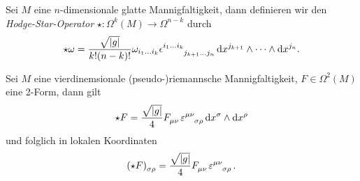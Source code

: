 \begin{definition}
Sei $M$ eine $n$-dimensionale glatte Mannigfaltigkeit, dann definieren wir den
\emph{Hodge-Star-Operator} $\star:\Omega^k(M)\to \Omega^{n-k}$ durch
\begin{equation}
\star \omega = \frac{\sqrt{\vert g \vert}}{k!(n-k)!} 
\omega_{i_1 \dots i_k} 
\tensor{\epsilon}{^{i_1 \dots i_k}_{j_{k+1} \dots j_n}}
\dif x^{j_{k+1}} \wedge \dots \wedge \dif x^{j_n}.
\end{equation}
\end{definition}
\begin{beispiel}
Sei $M$ eine vierdinemsionale (pseudo-)riemannsche Mannigfaltigkeit, $F\in
\Omega^2(M)$ eine 2-Form, dann gilt
\begin{equation}
\begin{split}
\star F=
\frac{\sqrt{|g|}}{4}\tensor{F}{_\mu_\nu}
\tensor{\varepsilon}{^\mu^\nu_\sigma_\rho}
\dif\tensor{x}{^\sigma}\wedge\dif\tensor{x}{^\rho}
\end{split}
\end{equation}
und folglich in lokalen Koordinaten
\begin{equation}
\tensor{(\star
F)}{_\sigma_\rho}=\frac{\sqrt{|g|}}{4}\tensor{F}{_\mu_\nu} \tensor{\varepsilon}{^\mu^\nu_\sigma_\rho}\,.
\end{equation}
\end{beispiel}
